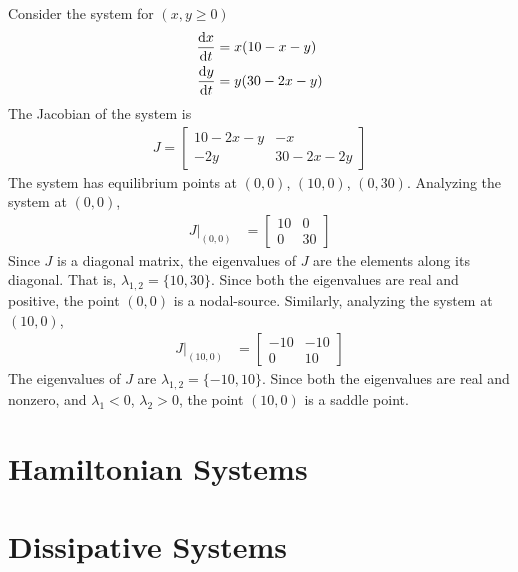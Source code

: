 \documentclass[12pt,1in]{article}
\newenvironment{Example}[2][Example]{\begin{trivlist}
		\item[\hskip \labelsep {\bfseries #1}\hskip \labelsep {\bfseries #2.}]}{\end{trivlist}}
\begin{document}
\begin{Example}{1} \cite[p.~488]{diff_eq}
	Consider the system for $(x,y \geq 0)$
	\begin{align*}
    \derivative{x}{t} &= x(10 - x - y) \\
    \derivative{y}{t} &= y(30 - 2x - y)
\end{align*}
The Jacobian of the system is 
\begin{align*}
    J = \begin{bmatrix}
    10 - 2x - y & -x \\
    -2y & 30 - 2x - 2y
    \end{bmatrix}
\end{align*}
The system has equilibrium points at $(0,0)$, $(10,0)$, $(0,30)$. Analyzing the system at $(0,0)$,
\begin{align*}
    J|_{(0,0)} &= \begin{bmatrix}
    10 & 0 \\
    0 & 30
    \end{bmatrix}
\end{align*}
Since $J$ is a diagonal matrix, the eigenvalues of $J$ are the elements along its diagonal. That is, $\lambda_{1,2} = \{ 10, 30 \}$. Since both the eigenvalues are real and positive, the point $(0,0)$ is a nodal-source.
Similarly, analyzing the system at $(10,0)$,
\begin{align*}
    J|_{(10,0)} &= 
    \begin{bmatrix}
    -10 & -10\\
    0 & 10 
    \end{bmatrix}
\end{align*}
The eigenvalues of $J$ are $\lambda_{1,2} = \{-10, 10\}$. Since both the eigenvalues are real and nonzero, and $\lambda_1 < 0$, $\lambda_2 > 0$, the point $(10,0)$ is a saddle point. 

\end{Example}

\section{Hamiltonian Systems}
\section{Dissipative Systems}



\end{document}
